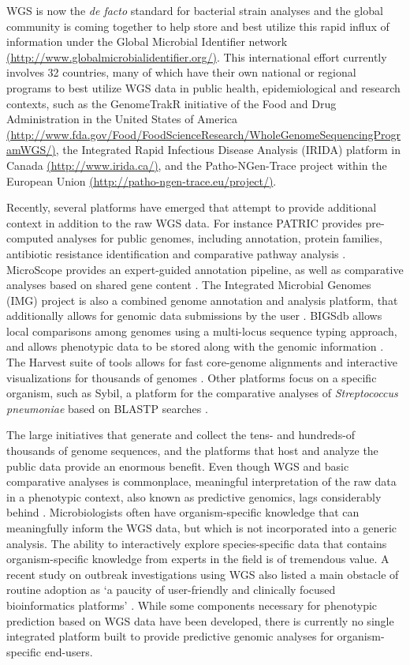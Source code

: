 \documentclass[doublespacing, linenumbers]{bmcart}
\begin{document}
  WGS is now the \textit{de facto} standard for bacterial strain analyses and the global community is coming together to help store and best utilize this rapid influx of information under the Global Microbial Identifier network \url{(http://www.globalmicrobialidentifier.org/)}. This international effort currently involves 32 countries, many of which have their own national or regional programs to best utilize WGS data in public health, epidemiological and research contexts, such as the GenomeTrakR initiative of the Food and Drug Administration in the United States of America \url{(http://www.fda.gov/Food/FoodScienceResearch/WholeGenomeSequencingProgramWGS/)}, the Integrated Rapid Infectious Disease Analysis (IRIDA) platform in Canada \url{(http://www.irida.ca/)}, and the Patho-NGen-Trace project within the European Union \url{(http://patho-ngen-trace.eu/project/)}.

Recently, several platforms have emerged that attempt to provide additional context in addition to the raw WGS data. For instance PATRIC provides pre-computed analyses for public genomes, including annotation, protein families, antibiotic resistance identification and comparative pathway analysis \cite{wattam_patric_2013}.   MicroScope provides an expert-guided annotation pipeline, as well as comparative analyses based on shared gene content
\cite{vallenet_microscope--integrated_2012}. The Integrated Microbial Genomes (IMG) project is also a combined genome annotation and analysis platform, that additionally allows for genomic data submissions by the user \cite{markowitz_img_2013}. BIGSdb allows local comparisons among genomes using a multi-locus sequence typing approach, and allows phenotypic data to be stored along with the genomic information \cite{jolley_bigsdb:_2010}. The Harvest suite of tools allows for fast core-genome alignments and interactive visualizations for thousands of genomes \cite{treangen_rapid_2014}. Other platforms focus on  a specific organism, such as Sybil, a platform for the comparative analyses of \textit{Streptococcus pneumoniae} based on BLASTP searches \cite{riley_using_2012}. 

The large initiatives that generate and collect the tens- and hundreds-of thousands of genome sequences, and the platforms that host and analyze the public data provide an enormous benefit. Even though WGS and basic comparative analyses is commonplace, meaningful interpretation of the raw data in a phenotypic context, also known as predictive genomics, lags considerably behind \cite{fricke_bacterial_2014}. Microbiologists often have organism-specific knowledge that can meaningfully inform the WGS data, but which is not incorporated into a generic analysis.  The ability to interactively explore species-specific data that contains organism-specific knowledge from experts in the field is of tremendous value. A recent study on outbreak investigations using WGS also listed a main obstacle of routine adoption as `a paucity of user-friendly and clinically focused bioinformatics platforms'  \cite{sherry_outbreak_2013}. While some components necessary for phenotypic prediction based on WGS data have been developed, there is currently no single integrated platform built to provide predictive genomic analyses for organism-specific end-users.
\end{document}
